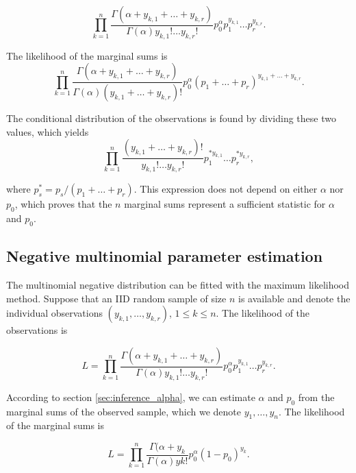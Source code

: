 \documentclass[12pt]{article}
\begin{document}
    \begin{equation*}
      \prod_{k=1}^n \frac{\Gamma(\alpha+y_{k,1}+\ldots+y_{k,r})}
      {\Gamma(\alpha)y_{k,1}!\ldots y_{k,r}!}p_0^{\alpha}
      p_1^{y_{k,1}} \ldots p_r^{y_{k,r}}.
    \end{equation*}

    The likelihood of the marginal sums is
    \begin{equation*}
      \prod_{k=1}^n \frac{\Gamma(\alpha+y_{k,1}+\ldots+y_{k,r})}
      {\Gamma(\alpha)(y_{k,1}+\ldots+y_{k,r})!}p_0^{\alpha}
      (p_1+\ldots+p_r)^{y_{k,1}+\ldots+y_{k,r}}.
    \end{equation*}

    The conditional distribution of the observations is found by
    dividing these two values, which yields
    \begin{equation*}
      \prod_{k=1}^n \frac{(y_{k,1}+\ldots+y_{k,r})!}
      {y_{k,1}!\ldots y_{k,r}!}
      p_1^{*y_{k,1}} \ldots p_r^{*y_{k,r}},
    \end{equation*}

    \noindent
    where $p_s^* = p_s/(p_1 + \ldots + p_r)$. This expression
    does not depend on either $\alpha$ nor $p_0$, which proves
    that the $n$ marginal sums represent a sufficient statistic
    for $\alpha$ and $p_0$.

\subsection{Negative multinomial parameter estimation}
\label{sec:param_est_nm}

    The multinomial negative distribution can be fitted with the
    maximum likelihood method. Suppose that an IID random sample of
    size $n$ is available and denote the individual observations
    $(y_{k,1}, \ldots, y_{k,r})$, $1 \leq k \leq n$. The likelihood
    of the observations is

    \begin{equation*}
      L = \prod_{k=1}^n \frac{\Gamma(\alpha+y_{k,1}+\ldots+y_{k,r})}
        {\Gamma(\alpha)y_{k,1}!\ldots y_{k,r}!} p_0^{\alpha}
        p_1^{y_{k,1}}\ldots p_r^{y_{k,r}} .
    \end{equation*}

    According to section \ref{sec:inference_alpha}, we can estimate
    $\alpha$ and $p_0$ from the marginal sums of the observed sample,
    which we denote $y_1, \ldots, y_n$. The likelihood of the marginal
    sums is

    \begin{equation*}
      L = \prod_{k=1}^n \frac{\Gamma(\alpha+y_k}
        {\Gamma(\alpha)yk!} p_0^{\alpha}
        (1-p_0)^{y_k} .
    \end{equation*}
\end{document}
